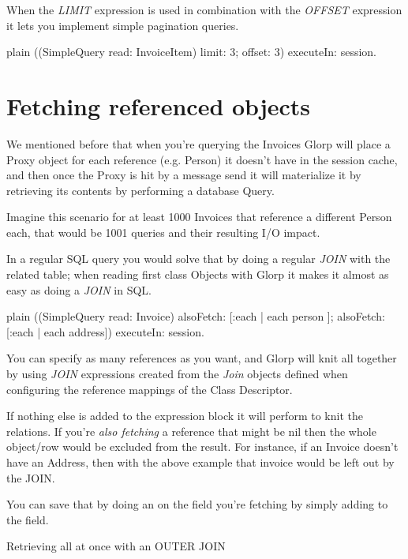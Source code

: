 \documentclass[10pt,twoside,english]{_support/latex/sbabook/sbabook}
\begin{document}
When the \textit{LIMIT} expression is used in combination with the \textit{OFFSET}
expression it lets you implement simple pagination queries.

\begin{displaycode}{plain}
((SimpleQuery read: InvoiceItem)
	limit: 3;
	offset: 3) executeIn: session.
\end{displaycode}
\section{Fetching referenced objects}
We mentioned before that when you're querying the Invoices Glorp will
place a Proxy object for each reference (e.g. Person) it doesn't have in
the session cache, and then once the Proxy is hit by a message send it will
materialize it by retrieving its contents by performing a database Query.

Imagine this scenario for at least 1000 Invoices that reference a different
Person each, that would be 1001 queries and their resulting I/O impact.

In a regular SQL query you would solve that by doing a regular \textit{JOIN} with
the related table; when reading first class Objects with Glorp it makes it
almost as easy as doing a \textit{JOIN} in SQL.

\begin{displaycode}{plain}
((SimpleQuery read: Invoice)
	alsoFetch: [:each | each person ];
	alsoFetch: [:each | each address]) executeIn: session.
\end{displaycode}

You can specify as many  references as you want, and Glorp
will knit all together by using \textit{JOIN} expressions created from the \textit{Join}
objects defined when configuring the reference mappings of the Class Descriptor.

If nothing else is added to the  expression block it will perform
 to knit the relations. If you're \textit{also fetching} a
reference that might be nil then the whole object/row would be excluded
from the result. For instance, if an Invoice doesn't have an Address, then
with the above example that invoice would be left out by the JOIN.

You can save that by doing an  on the field you're fetching
by simply adding  to the field.

Retrieving all at once with an OUTER JOIN
\end{document}

